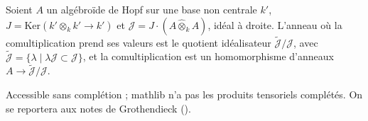 \begin{encadre}
\begin{definition*}
Soient $A$ un algébroïde de Hopf sur une base non centrale $k'$, $J = \mathrm{Ker}(k' \otimes_k k' \to k')$ et $\mathcal J = J\cdot(A \mathbin{\hat\otimes_k} A)$, idéal à droite. L'anneau où la comultiplication prend ses valeurs est le quotient idéalisateur $\tilde{\mathcal J}/\mathcal J$, avec $\tilde{\mathcal J} = \{\lambda \mid \lambda\mathcal J \subset \mathcal J\}$, et la comultiplication est un homomorphisme d'anneaux $A \to \tilde{\mathcal J}/\mathcal J$.
\end{definition*}
\end{encadre}
{\small Accessible sans complétion ; mathlib n'a pas les produits tensoriels complétés. On se reportera aux notes de Grothendieck ().\par}
